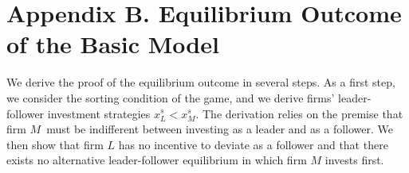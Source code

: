 \documentclass[nogrid,nosurname,sort&compress]{RFS}
\begin{document}

\section*{Appendix B. Equilibrium Outcome of the Basic Model}\label{appendix: duopoly equilibrium}

We derive the proof of the equilibrium outcome in several steps. As a first step, we consider
the sorting condition of the game, and we derive firms' leader-follower investment strategies
$x_{L}^{s}<x_{M}^{s}$. The derivation relies on the premise that firm $M$\ must be indifferent
between investing as a leader and as a follower. We then show that firm $L$ has no incentive to
deviate as a follower and that there exists no alternative leader-follower equilibrium in which
firm $M$ invests first.
\end{document}
